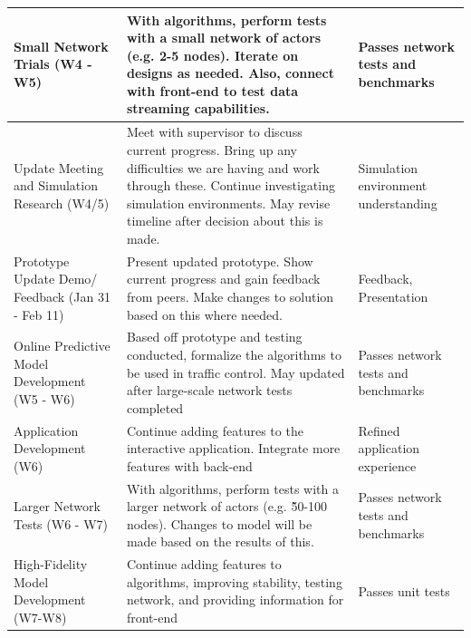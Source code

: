 \documentclass{article}
\begin{document}
\begin{longtable}{|p{4.5cm}|p{6cm}|p{4.5cm}|}
    Small Network Trials (W4 - W5)                    & With algorithms, perform tests with a small network of actors (e.g. 2-5 nodes). Iterate on designs as needed. Also, connect with front-end to test data streaming capabilities.                                                    & Passes network tests and benchmarks   \\ \hline
    Update Meeting and Simulation Research (W4/5)     & Meet with supervisor to discuss current progress. Bring up any difficulties we are having and work through these. Continue investigating simulation environments. May revise timeline after decision about this is made.           & Simulation environment understanding  \\ \hline
    Prototype Update Demo/ Feedback (Jan 31 - Feb 11) & Present updated prototype. Show current progress and gain feedback from peers. Make changes to solution based on this where needed.                                                                                                & Feedback, Presentation                \\ \hline
    Online Predictive Model Development (W5 - W6)     & Based off prototype and testing conducted, formalize the algorithms to be used in traffic control. May updated after large-scale network tests completed                                                                           & Passes network tests and benchmarks   \\ \hline
    Application Development (W6)                      & Continue adding features to the interactive application. Integrate more features with back-end                                                                                                                                     & Refined application experience        \\ \hline
    Larger Network Tests (W6 - W7)                    & With algorithms, perform tests with a larger network of actors (e.g. \~50-100 nodes). Changes to model will be made based on the results of this.                                                                                  & Passes network tests and benchmarks   \\ \hline
    High-Fidelity Model Development (W7-W8)           & Continue adding features to algorithms, improving stability, testing network, and providing information for front-end                                                                                                              & Passes unit tests                     \\ \hline

\end{longtable}
\end{document}
